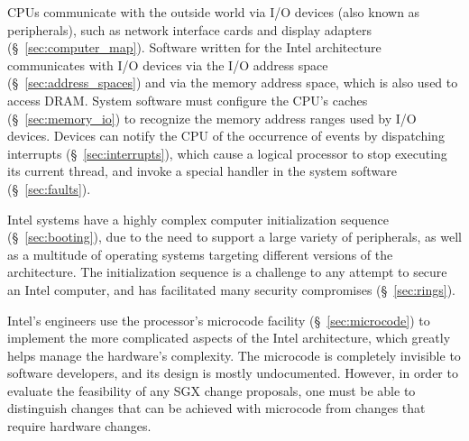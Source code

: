 CPUs communicate with the outside world via I/O devices (also known as
peripherals), such as network interface cards and display adapters
(\S~\ref{sec:computer_map}). Software written for the Intel architecture
communicates with I/O devices via the I/O address space
(\S~\ref{sec:address_spaces}) and via the memory address space, which is also
used to access DRAM. System software must configure the CPU's caches
(\S~\ref{sec:memory_io}) to recognize the memory address ranges used by I/O
devices. Devices can notify the CPU of the occurrence of events by dispatching
interrupts (\S~\ref{sec:interrupts}), which cause a logical processor to stop
executing its current thread, and invoke a special handler in the system
software (\S~\ref{sec:faults}).

Intel systems have a highly complex computer initialization sequence
(\S~\ref{sec:booting}), due to the need to support a large variety of
peripherals, as well as a multitude of operating systems targeting different
versions of the architecture. The initialization sequence is a challenge to any
attempt to secure an Intel computer, and has facilitated many security
compromises (\S~\ref{sec:rings}).

Intel's engineers use the processor's microcode facility
(\S~\ref{sec:microcode}) to implement the more complicated aspects of the Intel
architecture, which greatly helps manage the hardware's complexity. The
microcode is completely invisible to software developers, and its design is
mostly undocumented. However, in order to evaluate the feasibility of any SGX
change proposals, one must be able to distinguish changes that can be achieved
with microcode from changes that require hardware changes.
